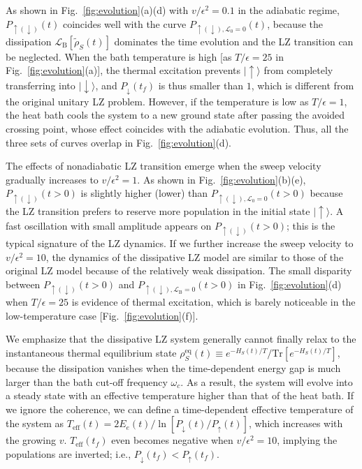 \documentclass[english,nofootinbib, pra, twocolumn,superscriptaddress]{revtex4-1}
\begin{document}
As shown in Fig.~\ref{fig:evolution}(a)(d) with $v/\epsilon^{2}=0.1$
in the adiabatic regime, $P_{\uparrow(\downarrow)}(t)$ coincides
well with the curve $P_{\uparrow(\downarrow),\mathcal{L}_{\text{0}}=0}(t)$,
because the dissipation $\mathcal{L}_{\text{B}}[\tilde{\rho}_{S}(t)]$
dominates the time evolution and the LZ transition can be neglected.
When the bath temperature is high [as $T/\epsilon=25$ in Fig.~\ref{fig:evolution}(a)],
the thermal excitation prevents $\vert\uparrow\rangle$ from completely
transferring into $\vert\downarrow\rangle$, and $P_{\downarrow}(t_{f})$
is thus smaller than $1$, which is different from the original unitary LZ
problem. However, if the temperature is low as $T/\epsilon=1$,
the heat bath cools the system to a new ground state after
passing the avoided crossing point, whose effect coincides with
the adiabatic evolution. Thus, all the three sets of curves overlap
in Fig.~\ref{fig:evolution}(d).

The effects of nonadiabatic LZ transition emerge when the
sweep velocity gradually increases to $v/\epsilon^{2}=1$. As shown in Fig.~\ref{fig:evolution}(b)(e),
$P_{\uparrow(\downarrow)}(t>0)$ is slightly higher (lower) than $P_{\uparrow(\downarrow),\mathcal{L}_{\text{0}}=0}(t>0)$
because the LZ transition prefers to reserve more population in
the initial state $\vert\uparrow\rangle$. A fast oscillation with
small amplitude appears on $P_{\uparrow(\downarrow)}(t>0)$; this
is the typical signature of the LZ dynamics. If we further increase
the sweep velocity to $v/\epsilon^{2}=10$, the dynamics of the dissipative
LZ model are similar to those of the original LZ model because of the
relatively weak dissipation. The small disparity between $P_{\uparrow(\downarrow)}(t>0)$
and $P_{\uparrow(\downarrow),\mathcal{L}_{\text{B}}=0}(t>0)$ in Fig.~\ref{fig:evolution}(d) when
$T/\epsilon=25$ is evidence of thermal excitation, which is barely noticeable in the low-temperature case [Fig.~\ref{fig:evolution}(f)].

We emphasize that the dissipative LZ system generally cannot
finally relax to the instantaneous thermal equilibrium state $\rho_{S}^{\text{eq}}(t)\equiv e^{-H_{S}(t)/T}/\text{Tr}[e^{-H_{S}(t)/T}]$, because the dissipation vanishes when the time-dependent energy gap is
much larger than the bath cut-off frequency $\omega_{c}$. As a result,
the system will evolve into a steady state with an effective temperature
higher than that of the heat bath. If we ignore the coherence, we can define
a time-dependent effective temperature of the system as $T_{\text{eff}}(t)=2E_{e}(t)/\ln[P_{\downarrow}(t)/P_{\uparrow}(t)]$,
which increases with the growing $v$. $T_{\text{eff}}(t_{f})$ even becomes negative when $v/\epsilon^{2}=10$,
implying the populations are inverted; i.e., $P_{\downarrow}(t_{f})<P_{\uparrow}(t_{f})$.
\end{document}
